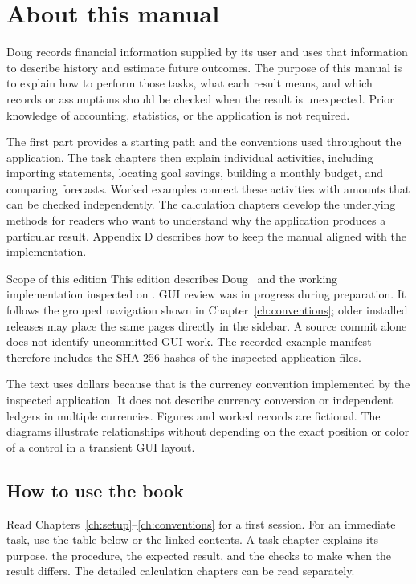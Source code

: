 \chapter*{About this manual}
Doug records financial information supplied by its user and uses that information to describe history and estimate future outcomes. The purpose of this manual is to explain how to perform those tasks, what each result means, and which records or assumptions should be checked when the result is unexpected. Prior knowledge of accounting, statistics, or the application is not required.

The first part provides a starting path and the conventions used throughout the application. The task chapters then explain individual activities, including importing statements, locating goal savings, building a monthly budget, and comparing forecasts. Worked examples connect these activities with amounts that can be checked independently. The calculation chapters develop the underlying methods for readers who want to understand why the application produces a particular result. Appendix D describes how to keep the manual aligned with the implementation.

\begin{notebox}{Scope of this edition}
This edition describes Doug \AppVersion\ and the working implementation inspected on \ExampleDate. GUI review was in progress during preparation. It follows the grouped navigation shown in Chapter~\ref{ch:conventions}; older installed releases may place the same pages directly in the sidebar. A source commit alone does not identify uncommitted GUI work. The recorded example manifest therefore includes the SHA-256 hashes of the inspected application files.
\end{notebox}

The text uses dollars because that is the currency convention implemented by the inspected application. It does not describe currency conversion or independent ledgers in multiple currencies. Figures and worked records are fictional. The diagrams illustrate relationships without depending on the exact position or color of a control in a transient GUI layout.

\section*{How to use the book}
Read Chapters~\ref{ch:setup}--\ref{ch:conventions} for a first session. For an immediate task, use the table below or the linked contents. A task chapter explains its purpose, the procedure, the expected result, and the checks to make when the result differs. The detailed calculation chapters can be read separately.

